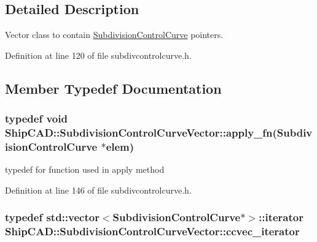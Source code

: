 \subsection{Detailed Description}
Vector class to contain \hyperlink{classShipCAD_1_1SubdivisionControlCurve}{Subdivision\-Control\-Curve} pointers. 



Definition at line 120 of file subdivcontrolcurve.\-h.



\subsection{Member Typedef Documentation}
\hypertarget{classShipCAD_1_1SubdivisionControlCurveVector_a141aff5158a297112fec989165732299}{
\subsubsection[{apply\-\_\-fn}]{\setlength{\rightskip}{0pt plus 5cm}typedef void Ship\-C\-A\-D\-::\-Subdivision\-Control\-Curve\-Vector\-::apply\-\_\-fn({\bf Subdivision\-Control\-Curve} $\ast$elem)}}\label{classShipCAD_1_1SubdivisionControlCurveVector_a141aff5158a297112fec989165732299}


typedef for function used in apply method 



Definition at line 146 of file subdivcontrolcurve.\-h.

\hypertarget{classShipCAD_1_1SubdivisionControlCurveVector_a33907b10974aed115e0217c836424762}{
\subsubsection[{ccvec\-\_\-iterator}]{\setlength{\rightskip}{0pt plus 5cm}typedef std\-::vector$<${\bf Subdivision\-Control\-Curve}$\ast$$>$\-::iterator {\bf Ship\-C\-A\-D\-::\-Subdivision\-Control\-Curve\-Vector\-::ccvec\-\_\-iterator}}}\label{classShipCAD_1_1SubdivisionControlCurveVector_a33907b10974aed115e0217c836424762}


